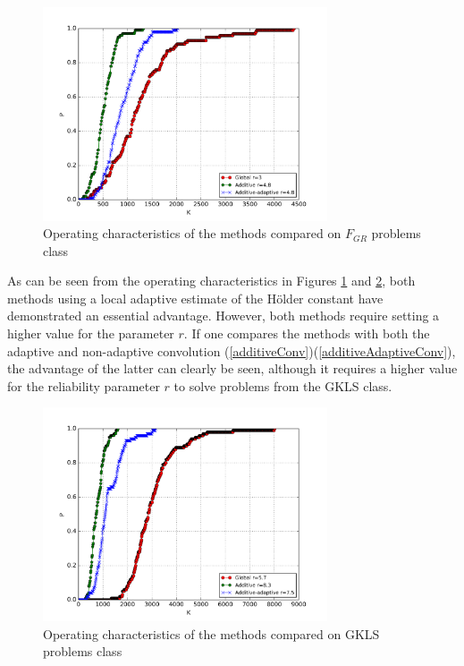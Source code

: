 \documentclass[procedia]{easychair}
\begin{document}
\begin{figure}[ht]
  	\center
    \includegraphics[width=0.75\textwidth]{images/grishagin.png}
    \caption{Operating characteristics of the methods compared on \(F_{GR}\) problems class}
    \label{fig:grishh_op}
\end{figure}
\par
As can be seen from the operating characteristics in Figures \ref{fig:grishh_op}
and \ref{fig:gkls_op}, both methods using a local adaptive estimate of the Hölder
constant have demonstrated an essential advantage. However, both methods require setting
a higher value for the parameter \(r\). If one compares the methods with both the
adaptive and non-adaptive convolution (\ref{additiveConv})(\ref{additiveAdaptiveConv}),
the advantage of the latter can clearly be seen, although it requires a higher value
for the reliability parameter \(r\) to solve problems from the GKLS class.

  \begin{figure}[ht]
  	\center
    \includegraphics[width=0.75\textwidth]{images/gkls-s.png}
    \caption{Operating characteristics of the methods compared on GKLS problems class}
    \label{fig:gkls_op}
  \end{figure}
\end{document}
